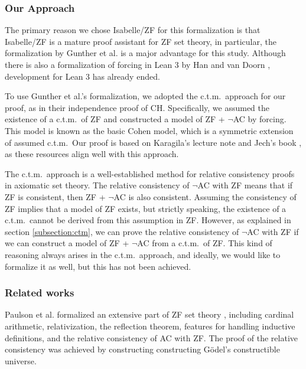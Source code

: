 \documentclass{report}
\begin{document}
\subsubsection{Our Approach}
The primary reason we chose Isabelle/ZF for this formalization is that Isabelle/ZF is a mature proof assistant for ZF set theory,
in particular, the formalization by Gunther et al. \cite{gunther_forcing} is a major advantage for this study.
Although there is also a formalization of forcing in Lean 3 by Han and van Doorn \cite{flypitch}, development for Lean 3 has already ended.

To use Gunther et al.'s formalization, we adopted the c.t.m.\  approach for our proof, as in their independence proof of CH.
Specifically, we assumed the existence of a c.t.m.\  of ZF and constructed a model of ZF + $\neg$AC by forcing.
This model is known as the basic Cohen model, which is a symmetric extension of assumed c.t.m.\ 
Our proof is based on Karagila's lecture note \cite{karagila} and Jech's book \cite{jech_set_theory,jech_AC},
as these resources align well with this approach.

The c.t.m.\  approach is a well-established method for relative consistency proofs in axiomatic set theory.
The relative consistency of $\neg$AC with ZF means that if ZF is consistent, then ZF + $\neg$AC is also consistent.
Assuming the consistency of ZF implies that a model of ZF exists, but strictly speaking, the existence of a c.t.m.\  cannot be derived from this assumption in ZF.
However, as explained in section \ref{subsection:ctm}, we can prove the relative consistency of $\neg$AC with ZF if 
we can construct a model of ZF + $\neg$AC from a c.t.m.\  of ZF.
This kind of reasoning always arises in the c.t.m.\  approach, and ideally, 
we would like to formalize it as well, but this has not been achieved.




\subsubsection{Related works}
Paulson et al. formalized an extensive part of ZF set theory 
\cite{paulson_datatype_impl,paulson_reflection,paulson_AC_consistency,paulson_cardinal_AC,paulson_datatype}
, including cardinal arithmetic, relativization, the reflection theorem, features for handling inductive definitions, and the relative consistency of AC with ZF.
The proof of the relative consistency was achieved by constructing constructing Gödel's constructible universe.
\end{document}
